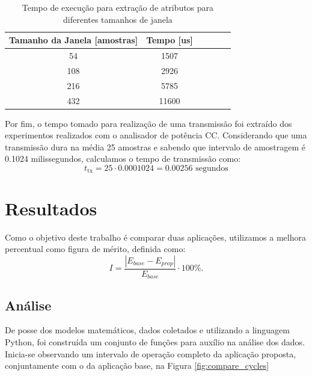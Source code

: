 \documentclass[a5paper]{ufsc-thesis}  %
\begin{document}
\begin{table}[h]
    \centering
    \begin{tabular}{|c|c|c|c|c|c|}
         \hline Tamanho da Janela [amostras] & Tempo [us]   \\
         \hline 54                           & 1507         \\
         \hline 108                          & 2926         \\
         \hline 216                          & 5785         \\
         \hline 432                          & 11600        \\
         \hline        
    \end{tabular}
    \caption{Tempo de execução para extração de atributos para diferentes tamanhos de janela}
    \label{tab:getfeat_time}
\end{table}

Por fim, o tempo tomado para realização de uma transmissão foi extraído dos experimentos realizados com o analisador de potência CC. Considerando que uma transmissão dura na média 25 amostras e sabendo que intervalo de amostragem é 0.1024 milissegundos, calculamos o tempo de transmissão como:
\begin{equation}
    t_{\text{tx}} = 25 \cdot 0.0001024 = 0.00256 \text{ segundos}
\end{equation}
    
\chapter{Resultados}
Como o objetivo deste trabalho é comparar duas aplicações, utilizamos a melhora percentual como figura de mérito, definida como:
\begin{equation}
    I = \frac{|{E_{base} - E_{prop}}|}{E_{base}} \cdot 100\%.
\end{equation}

\section{Análise}

De posse dos modelos matemáticos, dados coletados e utilizando a linguagem Python, foi construída um conjunto de funções para auxílio na análise dos dados. Inicia-se observando um intervalo de operação completo da aplicação proposta, conjuntamente com o da aplicação base, na Figura \ref{fig:compare_cycles}
\end{document}
